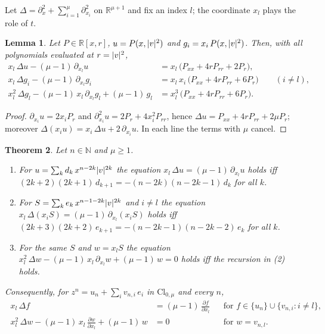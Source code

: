 \documentclass[11pt,a4paper]{article}
\newcommand{\R}{\mathbb{R}}
\newcommand{\N}{\mathbb{N}}
\DeclarePairedDelimiter{\abs}{\lvert}{\rvert}
\newtheorem{theorem}{Theorem}
\newtheorem{lemma}[theorem]{Lemma}
\theoremstyle{remark}
\begin{document}
Let $\Delta=\partial_x^2+\sum_{i=1}^{\mu}\partial_{x_i}^2$ on $\R^{\mu+1}$ and fix an index $l$;
the coordinate $x_l$ plays the role of $t$.

\begin{lemma}\label{lem:axialN}
Let $P\in\R[x,r]$, $u=P(x,\abs{v}^2)$ and $g_i=x_i\,P(x,\abs{v}^2)$. Then, with all
polynomials evaluated at $r=\abs{v}^2$,
\begin{align*}
  x_l\,\Delta u-(\mu-1)\,\partial_{x_l}u&=x_l\,\bigl(P_{xx}+4rP_{rr}+2P_r\bigr),\\
  x_l\,\Delta g_i-(\mu-1)\,\partial_{x_l}g_i&=x_l\,x_i\,\bigl(P_{xx}+4rP_{rr}+6P_r\bigr)\qquad(i\ne l),\\
  x_l^2\,\Delta g_l-(\mu-1)\,x_l\,\partial_{x_l}g_l+(\mu-1)\,g_l&=x_l^3\,\bigl(P_{xx}+4rP_{rr}+6P_r\bigr).
\end{align*}
\end{lemma}

\begin{proof}
$\partial_{x_i}u=2x_iP_r$ and $\partial_{x_i}^2u=2P_r+4x_i^2P_{rr}$, hence
$\Delta u=P_{xx}+4rP_{rr}+2\mu P_r$; moreover $\Delta(x_iu)=x_i\,\Delta u+2\,\partial_{x_i}u$.
In each line the terms with $\mu$ cancel.
\end{proof}

\begin{theorem}\label{thm:cliffordlb}
Let $n\in\N$ and $\mu\ge1$.
\begin{enumerate}
  \item For $u=\sum_kd_k\,x^{n-2k}\abs{v}^{2k}$ the equation
  $x_l\,\Delta u=(\mu-1)\,\partial_{x_l}u$ holds iff
  $(2k+2)(2k+1)\,d_{k+1}=-(n-2k)(n-2k-1)\,d_k$ for all $k$.
  \item For $S=\sum_ke_k\,x^{n-1-2k}\abs{v}^{2k}$ and $i\ne l$ the equation
  $x_l\,\Delta(x_iS)=(\mu-1)\,\partial_{x_l}(x_iS)$ holds iff
  $(2k+3)(2k+2)\,e_{k+1}=-(n-2k-1)(n-2k-2)\,e_k$ for all $k$.
  \item For the same $S$ and $w=x_lS$ the equation
  $x_l^2\,\Delta w-(\mu-1)\,x_l\,\partial_{x_l}w+(\mu-1)\,w=0$ holds iff the recursion in (2) holds.
\end{enumerate}
Consequently, for $z^n=u_n+\sum_iv_{n,i}\,e_i$ in $\mathrm{Cl}_{0,\mu}$ and every $n$,
\[
  \boxed{\;
  \begin{aligned}
  x_l\,\Delta f&=(\mu-1)\,\frac{\partial f}{\partial x_l}
    &&\text{for } f\in\{u_n\}\cup\{v_{n,i}:i\ne l\},\\
  x_l^2\,\Delta w-(\mu-1)\,x_l\,\frac{\partial w}{\partial x_l}+(\mu-1)\,w&=0
    &&\text{for } w=v_{n,l}.
  \end{aligned}
  \;}
\]
\end{theorem}
\end{document}
